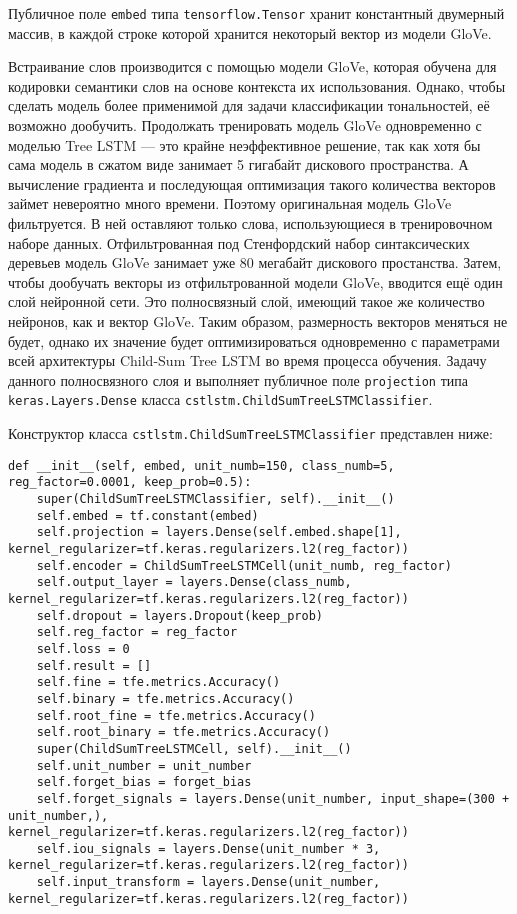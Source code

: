 Публичное поле \texttt{embed} типа \texttt{tensorflow.Tensor} хранит константный двумерный массив, в каждой строке которой хранится некоторый вектор из модели GloVe.

Встраивание слов производится с помощью модели GloVe, которая обучена для кодировки семантики слов на основе контекста их использования. Однако, чтобы сделать модель более применимой для задачи классификации тональностей, её возможно дообучить. Продолжать тренировать модель GloVe одновременно с моделью Tree LSTM --- это крайне неэффективное решение, так как хотя бы сама модель в сжатом виде занимает 5 гигабайт дискового пространства. А вычисление градиента и последующая оптимизация такого количества векторов займет невероятно много времени. Поэтому оригинальная модель GloVe фильтруется. В ней оставляют только слова, использующиеся в тренировочном наборе данных. Отфильтрованная под Стенфордский набор синтаксических деревьев модель GloVe занимает уже 80 мегабайт дискового простанства. Затем, чтобы дообучать векторы из отфильтрованной модели GloVe, вводится ещё один слой нейронной сети. Это полносвязный слой, имеющий такое же количество нейронов, как и вектор GloVe. Таким образом, размерность векторов меняться не будет, однако их значение будет  оптимизироваться одновременно с параметрами всей архитектуры Child-Sum Tree LSTM во время процесса обучения. Задачу данного полносвязного слоя и выполняет публичное поле \texttt{projection} типа \texttt{keras.Layers.Dense} класса \texttt{cstlstm.ChildSumTreeLSTMClassifier}.

Конструктор класса \texttt{cstlstm.ChildSumTreeLSTMClassifier} представлен ниже:
\medskip
\begin{lstlisting}[style=Python]
  def __init__(self, embed, unit_numb=150, class_numb=5, reg_factor=0.0001, keep_prob=0.5):
    super(ChildSumTreeLSTMClassifier, self).__init__()
    self.embed = tf.constant(embed)
    self.projection = layers.Dense(self.embed.shape[1], kernel_regularizer=tf.keras.regularizers.l2(reg_factor))
    self.encoder = ChildSumTreeLSTMCell(unit_numb, reg_factor)
    self.output_layer = layers.Dense(class_numb, kernel_regularizer=tf.keras.regularizers.l2(reg_factor))
    self.dropout = layers.Dropout(keep_prob)
    self.reg_factor = reg_factor
    self.loss = 0
    self.result = []
    self.fine = tfe.metrics.Accuracy()
    self.binary = tfe.metrics.Accuracy()
    self.root_fine = tfe.metrics.Accuracy()
    self.root_binary = tfe.metrics.Accuracy()
    super(ChildSumTreeLSTMCell, self).__init__()
    self.unit_number = unit_number
    self.forget_bias = forget_bias
    self.forget_signals = layers.Dense(unit_number, input_shape=(300 + unit_number,), kernel_regularizer=tf.keras.regularizers.l2(reg_factor))
    self.iou_signals = layers.Dense(unit_number * 3, kernel_regularizer=tf.keras.regularizers.l2(reg_factor))
    self.input_transform = layers.Dense(unit_number, kernel_regularizer=tf.keras.regularizers.l2(reg_factor))
\end{lstlisting}
\medskip

